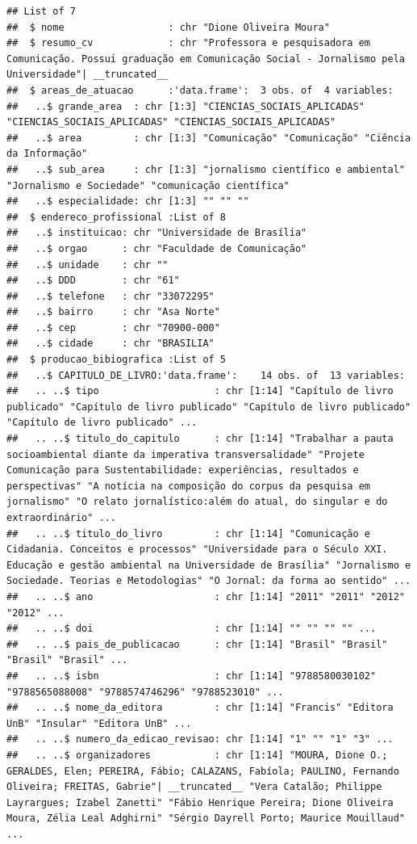 \documentclass[]{article}
\begin{document}
\begin{verbatim}
## List of 7
##  $ nome                  : chr "Dione Oliveira Moura"
##  $ resumo_cv             : chr "Professora e pesquisadora em Comunicação. Possui graduação em Comunicação Social - Jornalismo pela Universidade"| __truncated__
##  $ areas_de_atuacao      :'data.frame':  3 obs. of  4 variables:
##   ..$ grande_area  : chr [1:3] "CIENCIAS_SOCIAIS_APLICADAS" "CIENCIAS_SOCIAIS_APLICADAS" "CIENCIAS_SOCIAIS_APLICADAS"
##   ..$ area         : chr [1:3] "Comunicação" "Comunicação" "Ciência da Informação"
##   ..$ sub_area     : chr [1:3] "jornalismo científico e ambiental" "Jornalismo e Sociedade" "comunicação científica"
##   ..$ especialidade: chr [1:3] "" "" ""
##  $ endereco_profissional :List of 8
##   ..$ instituicao: chr "Universidade de Brasília"
##   ..$ orgao      : chr "Faculdade de Comunicação"
##   ..$ unidade    : chr ""
##   ..$ DDD        : chr "61"
##   ..$ telefone   : chr "33072295"
##   ..$ bairro     : chr "Asa Norte"
##   ..$ cep        : chr "70900-000"
##   ..$ cidade     : chr "BRASILIA"
##  $ producao_bibiografica :List of 5
##   ..$ CAPITULO_DE_LIVRO:'data.frame':    14 obs. of  13 variables:
##   .. ..$ tipo                    : chr [1:14] "Capítulo de livro publicado" "Capítulo de livro publicado" "Capítulo de livro publicado" "Capítulo de livro publicado" ...
##   .. ..$ titulo_do_capitulo      : chr [1:14] "Trabalhar a pauta socioambiental diante da imperativa transversalidade" "Projete Comunicação para Sustentabilidade: experiências, resultados e perspectivas" "A notícia na composição do corpus da pesquisa em jornalismo" "O relato jornalístico:além do atual, do singular e do extraordinário" ...
##   .. ..$ titulo_do_livro         : chr [1:14] "Comunicação e Cidadania. Conceitos e processos" "Universidade para o Século XXI. Educação e gestão ambiental na Universidade de Brasília" "Jornalismo e Sociedade. Teorias e Metodologias" "O Jornal: da forma ao sentido" ...
##   .. ..$ ano                     : chr [1:14] "2011" "2011" "2012" "2012" ...
##   .. ..$ doi                     : chr [1:14] "" "" "" "" ...
##   .. ..$ pais_de_publicacao      : chr [1:14] "Brasil" "Brasil" "Brasil" "Brasil" ...
##   .. ..$ isbn                    : chr [1:14] "9788580030102" "9788565088008" "9788574746296" "9788523010" ...
##   .. ..$ nome_da_editora         : chr [1:14] "Francis" "Editora UnB" "Insular" "Editora UnB" ...
##   .. ..$ numero_da_edicao_revisao: chr [1:14] "1" "" "1" "3" ...
##   .. ..$ organizadores           : chr [1:14] "MOURA, Dione O.; GERALDES, Elen; PEREIRA, Fábio; CALAZANS, Fabíola; PAULINO, Fernando Oliveira; FREITAS, Gabrie"| __truncated__ "Vera Catalão; Philippe Layrargues; Izabel Zanetti" "Fábio Henrique Pereira; Dione Oliveira Moura, Zélia Leal Adghirni" "Sérgio Dayrell Porto; Maurice Mouillaud" ...

\end{verbatim}
\end{document}
